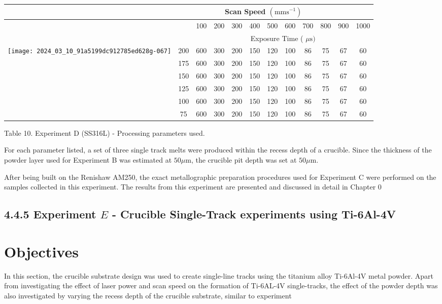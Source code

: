 \documentclass[10pt]{article}
\begin{document}
\begin{center}
\begin{tabular}{|c|c|c|c|c|c|c|c|c|c|c|c|}
\hline
 & \multicolumn{10}{|c|}{Scan Speed $\left(\mathrm{mms}^{-1}\right)$} &  \\
\hline
 &  & 100 & 200 & 300 & 400 & 500 & 600 & 700 & 800 & 900 & 1000 \\
\hline
 &  & \multicolumn{10}{|c|}{Exposure Time ( $\mu \mathrm{s})$} \\
\hline
\multirow{6}{*}{\texttt{[image: 2024\_03\_10\_91a5199dc912785ed628g-067]}
} & 200 & 600 & 300 & 200 & 150 & 120 & 100 & 86 & 75 & 67 & 60 \\
\hline
 & 175 & 600 & 300 & 200 & 150 & 120 & 100 & 86 & 75 & 67 & 60 \\
\hline
 & 150 & 600 & 300 & 200 & 150 & 120 & 100 & 86 & 75 & 67 & 60 \\
\hline
 & 125 & 600 & 300 & 200 & 150 & 120 & 100 & 86 & 75 & 67 & 60 \\
\hline
 & 100 & 600 & 300 & 200 & 150 & 120 & 100 & 86 & 75 & 67 & 60 \\
\hline
 & 75 & 600 & 300 & 200 & 150 & 120 & 100 & 86 & 75 & 67 & 60 \\
\hline
\end{tabular}
\end{center}

Table 10. Experiment D (SS316L) - Processing parameters used.

For each parameter listed, a set of three single track melts were produced within the recess depth of a crucible. Since the thickness of the powder layer used for Experiment B was estimated at $50 \mu \mathrm{m}$, the crucible pit depth was set at $50 \mu \mathrm{m}$.

After being built on the Renishaw AM250, the exact metallographic preparation procedures used for Experiment $\mathrm{C}$ were performed on the samples collected in this experiment. The results from this experiment are presented and discussed in detail in Chapter 0

\subsection*{4.4.5 Experiment $E$ - Crucible Single-Track experiments using Ti-6Al-4V}
\section*{Objectives}
In this section, the crucible substrate design was used to create single-line tracks using the titanium alloy Ti-6Al-4V metal powder. Apart from investigating the effect of laser power and scan speed on the formation of Ti-6AL-4V single-tracks, the effect of the powder depth was also investigated by varying the recess depth of the crucible substrate, similar to experiment
\end{document}
